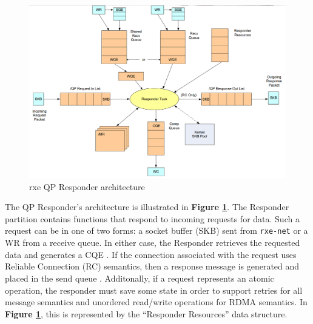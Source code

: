 \documentclass[11pt]{book}
\begin{document}
\begin{figure}[h]
\includegraphics[width=\textwidth]{rxe_resp}
\caption{rxe QP Responder architecture \protect\cite{pearson-10}}
\label{rxe-resp}
\end{figure}

The QP Responder's architecture is illustrated in \textbf{Figure
  \ref{rxe-resp}}. The Responder partition contains functions that respond to
incoming requests for data. Such a request can be in one of two forms: a socket
buffer (SKB) sent from \verb;rxe-net; or a WR from a receive queue. In either
case, the Responder retrieves the requested data and generates a CQE
\cite{pearson-10}. If the connection associated with the request uses Reliable
Connection (RC) semantics, then a response message is generated and placed in
the send queue \cite{InfiniBandTARoCE-10}\cite{pearson-10}. Additonally, if a
request represents an atomic operation, the responder must save some state in
order to support retries for all message semantics and unordered read/write
operations for RDMA semantics. In \textbf{Figure \ref{rxe-resp}}, this is
represented by the ``Responder Resources'' data structure.
\end{document}

